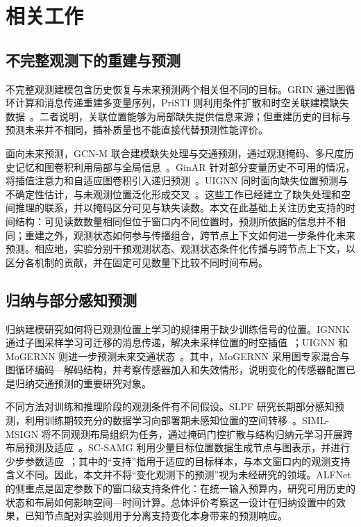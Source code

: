 \section{相关工作}\label{sec:related}
\subsection{不完整观测下的重建与预测}\label{sec:2_1}

不完整观测建模包含历史恢复与未来预测两个相关但不同的目标。GRIN 通过图循环计算和消息传递重建多变量序列，PriSTI 则利用条件扩散和时空关联建模缺失数据~\citep{cini2022filling,liu2023pristi}。二者说明，关联位置能够为局部缺失提供信息来源；但重建历史的目标与预测未来并不相同，插补质量也不能直接代替预测性能评价。

面向未来预测，GCN-M 联合建模缺失处理与交通预测，通过观测掩码、多尺度历史记忆和图卷积利用局部与全局信息~\citep{zuo2023graph}。GinAR 针对部分变量历史不可用的情况，将插值注意力和自适应图卷积引入递归预测~\citep{yu2024ginar}。UIGNN 同时面向缺失位置预测与不确定性估计，与未观测位置泛化形成交叉~\citep{mei2023uncertainty}。这些工作已经建立了缺失处理和空间推理的联系，并以掩码区分可见与缺失读数。本文在此基础上关注历史支持的时间结构：可见读数数量相同但位于窗口内不同位置时，预测所依据的信息并不相同；重建之外，观测状态如何参与传播组合，跨节点上下文如何进一步条件化未来预测。相应地，实验分别干预观测状态、观测状态条件化传播与跨节点上下文，以区分各机制的贡献，并在固定可见数量下比较不同时间布局。

\subsection{归纳与部分感知预测}\label{sec:2_2}

归纳建模研究如何将已观测位置上学习的规律用于缺少训练信号的位置。IGNNK 通过子图采样学习可迁移的消息传递，解决未采样位置的时空插值~\citep{wu2021inductive}；UIGNN 和 MoGERNN 则进一步预测未来交通状态~\citep{mei2023uncertainty,zhou2025mogernn}。其中，MoGERNN 采用图专家混合与图循环编码—解码结构，并考察传感器加入和失效情形，说明变化的传感器配置已是归纳交通预测的重要研究对象。

不同方法对训练和推理阶段的观测条件有不同假设。SLPF 研究长期部分感知预测，利用训练期较充分的数据学习向部署期未感知位置的空间转移~\citep{liu2025spatiotemporal}。SIML-MSIGN 将不同观测布局组织为任务，通过掩码门控扩散与结构归纳元学习开展跨布局预测及适应~\citep{zhao2026structure}。SC-SAMG 利用少量目标位置数据生成节点与图表示，并进行少步参数适应~\citep{wang2026cold}；其中的“支持”指用于适应的目标样本，与本文窗口内的观测支持含义不同。因此，本文并不将“变化观测下的预测”视为未经研究的领域。ALFNet 的侧重点是固定参数下的窗口级支持条件化：在统一输入预算内，研究可用历史的状态和布局如何影响空间—时间计算。总体评价考察这一设计在归纳设置中的效果，已知节点配对实验则用于分离支持变化本身带来的预测响应。

